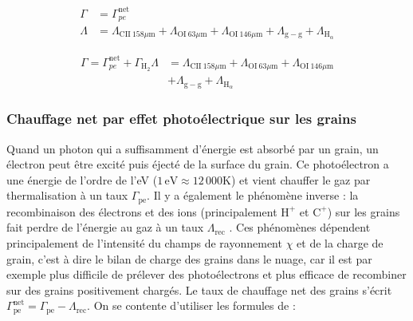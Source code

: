 \begin{equation}
    \begin{split}
        \Gamma &= \Gamma_{pe}^{\mathrm{net}} \\
        \Lambda &=   \Lambda_{\mathrm{CII}\ 158 \mu \mathrm{m}} + \Lambda_{\mathrm{OI}\ 63 \mu \mathrm{m}} + \Lambda_{\mathrm{OI}\ 146 \mu \mathrm{m}}  + \Lambda_{\mathrm{g}-\mathrm{g}} + \Lambda_{\mathrm{H}_\alpha}
    \end{split}
\end{equation}

\begin{equation}
    \begin{split}
        \Gamma = \Gamma_{pe}^{\mathrm{net}} + \Gamma_{\mathrm{H}_2} 
        \Lambda &=   \Lambda_{\mathrm{CII}\ 158 \mu \mathrm{m}} + \Lambda_{\mathrm{OI}\ 63 \mu \mathrm{m}} + \Lambda_{\mathrm{OI}\ 146 \mu \mathrm{m}}  \\ &+ \Lambda_{\mathrm{g}-\mathrm{g}} + \Lambda_{\mathrm{H}_\alpha}
    \end{split}
\end{equation}

\subsubsection{Chauffage net par effet photoélectrique sur les grains}

Quand un photon qui a suffisamment d'énergie est absorbé par un grain, un électron peut être excité puis éjecté de la surface du grain. Ce photoélectron a une énergie de l'ordre de l'eV ($1\,\mathrm{eV}\approx 12\,000$K) et vient chauffer le gaz par thermalisation à un taux $\Gamma_{\mathrm{pe}}$. Il y a également le phénomène inverse : la recombinaison des électrons et des ions (principalement $\mathrm{H}^+$ et $\mathrm{C}^+$) sur les grains fait perdre de l'énergie au gaz à un taux $\Lambda_{\mathrm{rec}}$ \cite{Lequeux}. Ces phénomènes dépendent principalement de l'intensité du champs de rayonnement $\chi$ et de la charge de grain, c'est à dire le bilan de charge des grains dans le nuage, car il est par exemple plus difficile de prélever des photoélectrons et plus efficace de recombiner sur des grains positivement chargés. Le taux de chauffage net des grains s'écrit $\Gamma^{\mathrm{net}}_{\mathrm{pe}} = \Gamma_{\mathrm{pe}} - \Lambda_{\mathrm{rec}}$. On se contente d'utiliser les formules de \cite{BakesTielens1994} :

